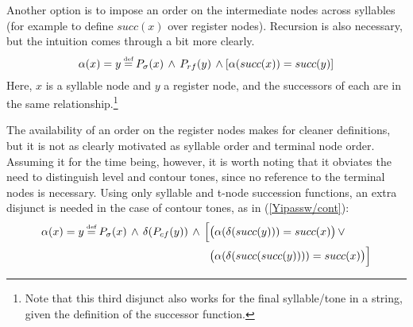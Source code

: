 \documentclass{article}
\newcommand\myeq{\mathrel{\stackrel{\makebox[0pt]{\mbox{\normalfont\tiny def}}}{=}}}
\begin{document}
Another option is to impose an order on the intermediate nodes across syllables (for example to define $succ(x)$ over register nodes). Recursion is also necessary, but the intuition comes through a bit more clearly.
\begin{equation}
\alpha(x) = y \myeq P_{\sigma}(x)\,\land\,P_{rf}(y)\,\land[\alpha(succ(x))=succ(y)]
\end{equation}
Here, $x$ is a syllable node and $y$ a register node, and the successors of each are in the same relationship.\footnote{Note that this third disjunct also works for the final syllable/tone in a string, given the definition of the successor function.}
\begin{center}
\end{center}
The availability of an order on the register nodes makes for cleaner definitions, but it is not as clearly motivated as syllable order and terminal node order. Assuming it for the time being, however, it is worth noting that it obviates the need to distinguish level and contour tones, since no reference to the terminal nodes is necessary. Using only syllable and t-node succession functions, an extra disjunct is needed in the case of contour tones, as in (\ref{Yipassw/cont}): 
\begin{equation} \label{Yipassw/cont}
\begin{aligned}
\alpha(x) = y \myeq P_{\sigma}(x)\,\land\,\delta(P_{cf}(y))\,\land\,\Big[&\big(\alpha(\delta(succ(y)))=succ(x)\big)\,\lor \\
&\big(\alpha(\delta(succ(succ(y))))=succ(x)\big)\Big]
\end{aligned} 
\end{equation} \par
\end{document}

